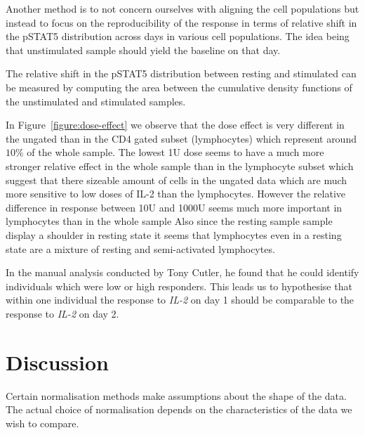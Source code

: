 Another method is to not concern ourselves with aligning the cell populations but instead to focus on the reproducibility of the response in terms of relative shift in the pSTAT5 distribution across days in various cell populations.
The idea being that unstimulated sample should yield the baseline on that day.

The relative shift in the pSTAT5 distribution between resting and stimulated can be measured by computing the area between the cumulative density functions of the unstimulated and stimulated samples.

In Figure~\ref{figure:dose-effect} we observe that the dose effect is very different in the ungated than in the CD4 gated subset (lymphocytes) which represent around $10\%$ of
the whole sample.
The lowest 1U dose seems to have a much more stronger relative effect in the whole sample than in the lymphocyte subset which suggest that there sizeable amount of cells in the ungated
data which are much more sensitive to low doses of IL-2 than the lymphocytes.
However the relative difference in response between 10U and 1000U seems much more important in lymphocytes than in the whole sample
Also since the resting sample sample display a shoulder in resting state it seems that lymphocytes even in a resting state are a mixture of resting and semi-activated lymphocytes.


In the manual analysis conducted by Tony Cutler, he found that he could identify individuals which were low or high responders.
This leads us to hypothesise that within one individual the response to \emph{IL-2} on day 1 should be comparable to the response to \emph{IL-2} on day 2.



\section{Discussion}


Certain normalisation methods make assumptions about the shape of the data.
The actual choice of normalisation depends on the characteristics of the data we wish to compare.

